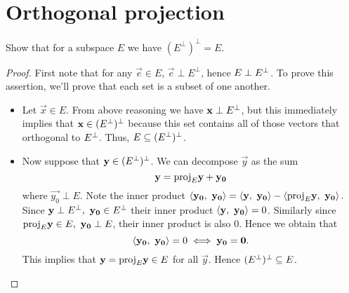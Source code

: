 \documentclass{article}
\begin{document}
\section{Orthogonal projection}
\setcounter{exercise}{11}
\begin{exercise}
  Show that for a subspace $E$ we have $(E^\perp)^\perp=E$.
\end{exercise}
\begin{proof}
  First note that for any $\vec{e}\in E$, $\vec{e}\perp E^\perp$, hence
  $E\perp E\perc$. To prove this assertion, we'll prove that each set is
  a subset of one another.
  \begin{itemize}
    \item Let $\vec{x}\in E$. From above reasoning we have 
      $\vec{x}\perp E\perc$, but this immediately implies that 
      $\vec{x}\in(E\perc)\perc$ because this set contains all of those 
      vectors that orthogonal to $E\perc$. Thus, 
      $E\subseteq (E\perc)\perc$.
    \item Now suppose that $\vec{y}\in (E\perc)\perc$. We can decompose 
      $\vec{y}$ as the sum
      \[\vec{y}=\proj{\vec{y}}{E}+\vec{y_0}\]
      where $\vec{y_0}\perp E$. Note the inner product
      $
        \ang{\vec{y_0,~\vec{y_0}}}=
        \ang{\vec{y},~\vec{y_0}}-\ang{\proj{\vec{y}}{E},~ \vec{y_0}}.
      $
      Since $\vec{y}\perp E\perc,~\vec{y_0}\in E\perc$ their inner product
      $\ang{\vec{y},~\vec{y_0}}=0$. Similarly since 
      $\proj{\vec{y}}{E}\in E,~ \vec{y_0}\perp E$, their inner product
      is also $0$. Hence we obtain that
      \[\ang{\vec{y_0},~\vec{y_0}}=0\iff \vec{y_0}=\vec{0}.\]
      This implies that $\vec{y}=\proj{\vec{y}}{E}\in E$ for all 
      $\vec{y}$. Hence $(E\perc)\perc\subseteq E$.
  \end{itemize}
\end{proof}
\newpage
\end{document}
